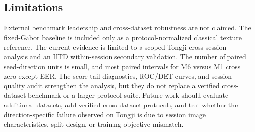 \subsection{Limitations}

External benchmark leadership and cross-dataset robustness are not claimed. The fixed-Gabor baseline is included only as a protocol-normalized classical texture reference. The current evidence is limited to a scoped Tongji cross-session analysis and an IITD within-session secondary validation. The number of paired seed-direction units is small, and most paired intervals for M6 versus M1 cross zero except EER. The score-tail diagnostics, ROC/DET curves, and session-quality audit strengthen the analysis, but they do not replace a verified cross-dataset benchmark or a larger protocol suite. Future work should evaluate additional datasets, add verified cross-dataset protocols, and test whether the direction-specific failure observed on Tongji is due to session image characteristics, split design, or training-objective mismatch.

